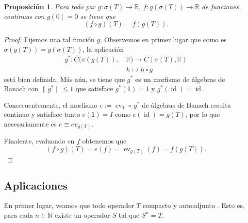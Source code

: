 \documentclass[11pt]{report}
\theoremstyle{colored}
\newtheorem{proposition}{Proposición}[section]
\newcommand{\N}{\mathbb{N}}
\newcommand{\R}{\mathbb{R}}
\newcommand{\ev}{\operatorname{ev}}
\newcommand{\id}{\operatorname{id}}
\begin{document}
\begin{proposition} Para todo par $g : \sigma(T) \to \R$, $f : g(\sigma(T)) \to \R$ de funciones continuas con $g(0) = 0$ se tiene que \[(f \circ g)(T) = f(g(T)).\]
\end{proposition}
\begin{proof} Fijemos una tal función $g$. Observemos en primer lugar que como es $\sigma(g(T)) = g(\sigma(T))$, la aplicación
\begin{align*}
g^* : C(\sigma(g(T)), \ &\R) \to C(\sigma(T),\R)\\
&h \longmapsto h \circ g
\end{align*}
está bien definida. Más aún, se tiene que $g^*$ es un morfismo de álgebras de Banach con $\|g^*\| \leq 1$ que satisface $g^*(\mathsf{1}) = \mathsf{1}$ y $g^*(\id) = \id$.

Consecuentemente, el morfismo $e := \ev_T \circ \ g^*$ de álgebras de Banach resulta continuo y satisface tanto $e(\mathsf{1}) = I$ como $e(\id) = g(T)$, por lo que necesariamente es $e \equiv ev_{g(T)}$. 

Finalente, evaluando en $f$ obtenemos que
\[
(f \circ g)(T) = e(f) = \ev_{g(T)}(f) = f(g(T)).
\]
\end{proof}

\subsection{Aplicaciones}

En primer lugar, veamos que todo operador $T$ compacto y autoadjunto . Esto es, para cada $n \in \N$ existe un operador $S$ tal que $S^n = T$.
\end{document}
